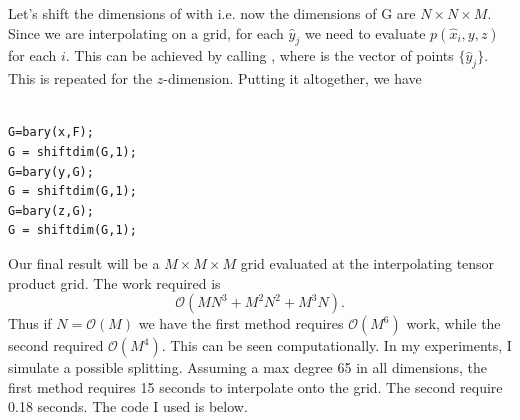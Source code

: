 \documentclass{article}
\begin{document}
Let's shift the dimensions of  with  i.e. now the dimensions of G are $N \times N \times M$. Since we are interpolating on a grid, for each $\hat{y}_j$ we need to evaluate $p(\hat{x}_i,y,z)$ for each $i$. This can be achieved by calling , where  is the vector of points $\{\hat{y}_j\}$. This is repeated for the $z$-dimension. Putting it altogether, we have
\begin{lstlisting}[frame=single]  % Start your code-block

G=bary(x,F);
G = shiftdim(G,1);
G=bary(y,G);
G = shiftdim(G,1);
G=bary(z,G);
G = shiftdim(G,1);
\end{lstlisting}
Our final result will be a $M \times M \times M$ grid evaluated at the interpolating tensor product grid. The work required is
 \begin{equation}
 \mathcal{O}(M N^3 + M^2 N^2 + M^3 N).
 \end{equation}
 Thus if $N =\mathcal{O}(M)$ we have the first method requires $\mathcal{O}(M^6)$ work, while the second required $\mathcal{O}(M^4)$. This can be seen computationally. In my experiments, I simulate a possible splitting. Assuming a max degree 65 in all dimensions, the first method requires 15 seconds to interpolate onto the grid. The second require 0.18 seconds. The code I used is below.
 
\end{document}
